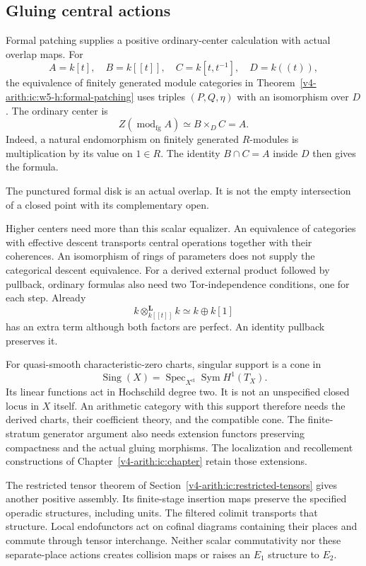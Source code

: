 \subsection{Gluing central actions}

Formal patching supplies a positive ordinary-center
calculation with actual overlap maps.
For
\[
 A=k[t],\quad B=k[[t]],\quad
 C=k[t,t^{-1}],\quad D=k((t)),
\]
the equivalence of finitely generated module categories
in Theorem~\ref{v4-arith:ic:w5-h:formal-patching}
uses triples $(P,Q,\eta)$ with an isomorphism over $D$.
The ordinary center is
\[
 Z(\operatorname{mod}_{\mathrm{fg}}A)
 \simeq B\times_D C=A.
\]
Indeed, a natural endomorphism on finitely generated
$R$-modules is multiplication by its value on
$1\in R$. The identity $B\cap C=A$ inside $D$
then gives the formula.

The punctured formal disk is an actual overlap.
It is not the empty intersection of a closed point
with its complementary open.

Higher centers need more than this scalar equalizer.
An equivalence of categories with effective descent
transports central operations together with their
coherences. An isomorphism of rings of parameters
does not supply the categorical descent equivalence.
For a derived external product followed by pullback,
ordinary formulas also need two Tor-independence
conditions, one for each step.
Already
\[
 k\otimes^{\mathbf L}_{k[[t]]}k\simeq k\oplus k[1]
\]
has an extra term although both factors are perfect.
An identity pullback preserves it.

For quasi-smooth characteristic-zero charts, singular
support is a cone in
\[
 \operatorname{Sing}(X)=
 \operatorname{Spec}_{X^{\mathrm{cl}}}
 \operatorname{Sym}H^1(T_X).
\]
Its linear functions act in Hochschild degree two.
It is not an unspecified closed locus in $X$ itself.
An arithmetic category with this support therefore needs
the derived charts, their coefficient theory, and the
compatible cone. The finite-stratum generator argument
also needs extension functors preserving compactness
and the actual gluing morphisms.
The localization and recollement constructions of
Chapter~\ref{v4-arith:ic:chapter} retain those extensions.

The restricted tensor theorem of
Section~\ref{v4-arith:ic:restricted-tensors}
gives another positive assembly.
Its finite-stage insertion maps preserve the specified
operadic structures, including units.
The filtered colimit transports that structure.
Local endofunctors act on cofinal diagrams containing
their places and commute through tensor interchange.
Neither scalar commutativity nor these separate-place
actions creates collision maps or raises an $E_1$
structure to $E_2$.

